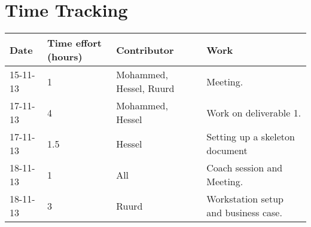 
\appendix
	\renewcommand{\thepage}{\thechapter-\arabic{page}}



\chapter{Time Tracking}

\begin{center}
    \begin{tabular}{| l | l | l | l |}
    \hline
    
    Date & Time effort (hours) & Contributor & Work\\ \hline \hline
    15-11-13 & 1  & Mohammed, Hessel, Ruurd & Meeting.\\ \hline
    17-11-13 & 4  & Mohammed, Hessel & Work on deliverable 1.\\ \hline
    17-11-13 & 1.5  & Hessel & Setting up a skeleton document\\ \hline
    18-11-13 & 1  & All & Coach session and Meeting.\\ \hline
    18-11-13 & 3  & Ruurd & Workstation setup and business case.\\ \hline
    
    \hline
    \end{tabular}
\end{center}







\clearpage
